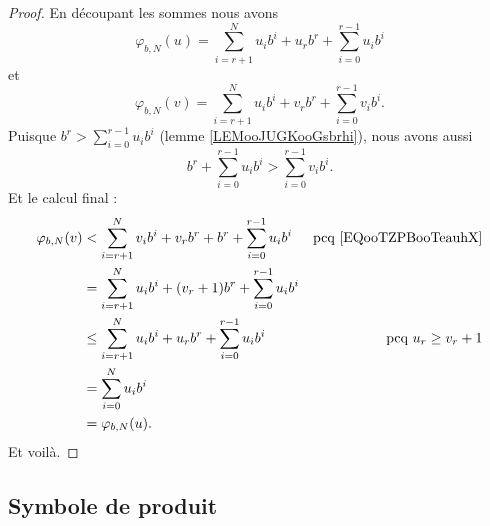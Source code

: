 \begin{proof}
	En découpant les sommes nous avons
	\begin{equation}
		\varphi_{b,N}(u)=\sum_{i=r+1}^Nu_ib^i+u_rb^r+\sum_{i=0}^{r-1}u_ib^i
	\end{equation}
	et
	\begin{equation}
		\varphi_{b,N}(v)=\sum_{i=r+1}^Nu_ib^i+v_rb^r+\sum_{i=0}^{r-1}v_ib^i.
	\end{equation}
	Puisque \( b^r>\sum_{i=0}^{r-1}u_ib^i\) (lemme \ref{LEMooJUGKooGsbrhi}), nous avons aussi
	\begin{equation}        \label{EQooTZPBooTeauhX}
		b^r+\sum_{i=0}^{r-1}u_ib^i>\sum_{i=0}^{r-1}v_ib^i.
	\end{equation}
	Et le calcul final :
	\begin{subequations}
		\begin{align}
			\varphi_{b,N}(v) & <   \sum_{i=r+1}^Nv_ib^i+v_rb^r+b^r+\sum_{i=0}^{r-1}u_ib^i & \text{pcq \eqref{EQooTZPBooTeauhX}} \\
			                 & =   \sum_{i=r+1}^Nu_ib^i+(v_r+1)b^r+\sum_{i=0}^{r-1}u_ib^i                                       \\
			                 & \leq  \sum_{i=r+1}^Nu_ib^i+u_rb^r+\sum_{i=0}^{r-1}u_ib^i   & \text{pcq } u_r\geq v_r+1           \\
			                 & =   \sum_{i=0}^Nu_ib^i                                                                           \\
			                 & =   \varphi_{b,N}(u).
		\end{align}
	\end{subequations}
	Et voilà.
\end{proof}



\subsection{Symbole de produit}

